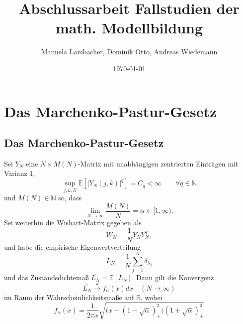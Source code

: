 \documentclass[a4paper, 11pt]{scrreprt}
\title{Abschlussarbeit Fallstudien der math. Modellbildung}
\author{Manuela Lambacher, Dominik Otto, Andreas Wiedemann}
\date{\today}
\newcommand{\RR}{\mathbb{R}}
\newcommand{\EE}{\mathbb{E}}
\newcommand{\NN}{\mathbb{N}}
\begin{document}
\parindent 0pt
\maketitle
\tableofcontents


\chapter{Das Marchenko-Pastur-Gesetz}

\section{Das Marchenko-Pastur-Gesetz}

Sei \(Y_N\) eine \(N\times M(N)\)-Matrix mit unabhängigen zentrierten Einträgen mit Varianz \(1\),
	\[\sup_{j,k,N} \EE\left[ | Y_N(j,k)|^q\right] = C_q < \infty \qquad \forall q \in \NN\]
und \(M(N) \in \NN\) so, dass
	\[\lim_{N\to\infty} \frac{M(N)}{N} = \alpha \in[1,\infty). \]
Sei weiterhin die Wishart-Matrix gegeben als 
	\[W_N = \frac{1}{N}Y_NY_N^T,\]
und habe die empirische Eigenwertverteilung
	\[L_N = \frac{1}{N} \sum_{j=1}^{N} \delta_{\lambda_j} \]
und das Zustandsdichtemaß \(\overline{L_N} = \EE[L_N]\). Dann gilt die Konvergenz
	\[\overline{L_N} \xrightarrow{\text{w}} f_{\alpha}(x)dx \quad(N\to\infty)\]
im Raum der Wahrscheinlichkeitsmaße auf \(\RR\), wobei
	\[f_{\alpha}(x)=\frac{1}{2\pi x}\sqrt{(x-(1-\sqrt{\alpha})^2_{+}((1+\sqrt{\alpha})^2_{+}} \]

\newpage
\end{document}
